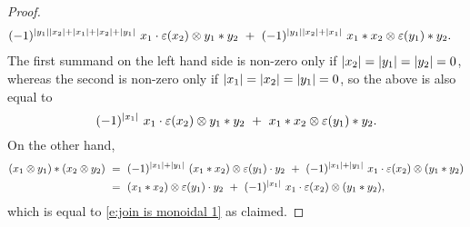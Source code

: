 \begin{proof}
\begin{equation*}
\begin{split}
	(-1)^{\bars{y_1} \bars{x_2} + \bars{x_1} + \bars{x_2} + \bars{y_1}} \ x_1 \cdot \varepsilon(x_2) \otimes y_1 \ast y_2 \ & + \ 
	(-1)^{\bars{y_1} \bars{x_2} + \bars{x_1}} \ x_1 \ast x_2 \otimes \varepsilon(y_1) \ast y_2.
	\end{split}
	\end{equation*}
	The first summand on the left hand side is non-zero only if $\vert{x_2}\vert = \vert{y_1}\vert = \vert{y_2}\vert = 0$, whereas the second is non-zero only if $\vert{x_1}\vert = \vert{x_2}\vert = \vert{y_1}\vert = 0$, so the above is also equal to
	\begin{equation} \label{e:join is monoidal 1}
	(-1)^{\bars{x_1}} \ x_1 \cdot \varepsilon(x_2) \otimes y_1 \ast y_2 \ + \ 
	x_1 \ast x_2 \otimes \varepsilon(y_1) \ast y_2.
	\end{equation}
	On the other hand,
	\begin{align*}
	(x_1 \otimes y_1) \ast (x_2 \otimes y_2) \ & =\ 
	(-1)^{\bars{x_1} + \bars{y_1}} \ (x_1 \ast x_2) \otimes \varepsilon(y_1) \cdot y_2 \ +\
	(-1)^{\bars{x_1} + \bars{y_1}} \ x_1 \cdot \varepsilon(x_2) \otimes (y_1 \ast y_2) \\ \ & =\ 
	(x_1 \ast x_2) \otimes \varepsilon(y_1) \cdot y_2 \ +\
	(-1)^{\bars{x_1}} \ x_1 \cdot \varepsilon(x_2) \otimes (y_1 \ast y_2),
	\end{align*}
	which is equal to \eqref{e:join is monoidal 1} as claimed.
\end{proof}
